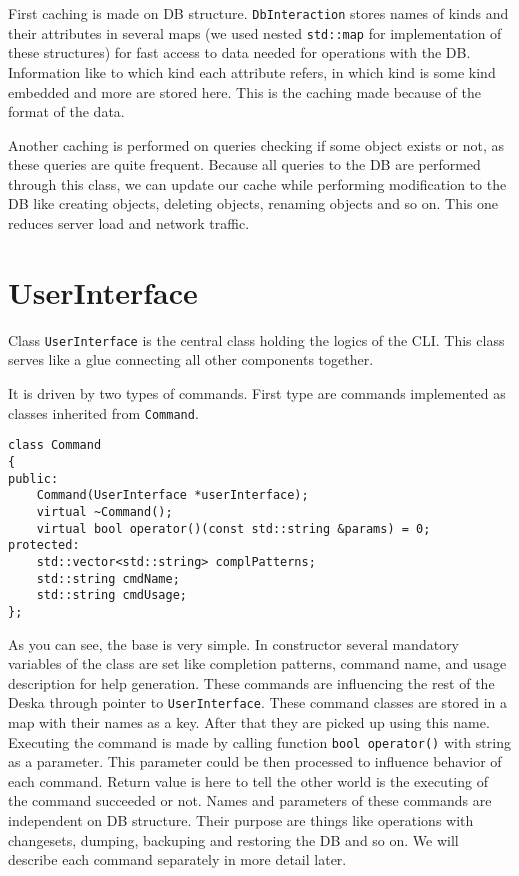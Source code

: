 \documentclass[deska]{subfiles}
\begin{document}
First caching is made on DB structure. {\tt DbInteraction} stores names of kinds and their attributes in several maps
(we used nested {\tt std::map} for implementation of these structures) for fast access to data needed for operations with
the DB. Information like to which kind each attribute refers, in which kind is some kind embedded and more are stored
here. This is the caching made because of the format of the data.

Another caching is performed on queries checking if some object exists or not, as these queries are quite frequent.
Because all queries to the DB are performed through this class, we can update our cache while performing modification to
the DB like creating objects, deleting objects, renaming objects and so on. This one reduces server load and network traffic.

\section{UserInterface}

Class {\tt UserInterface} is the central class holding the logics of the CLI. This class serves like a glue connecting
all other components together.

It is driven by two types of commands. First type are commands implemented as classes inherited from {\tt Command}.

\begin{verbatim}
class Command
{
public:
    Command(UserInterface *userInterface);
    virtual ~Command();
    virtual bool operator()(const std::string &params) = 0;
protected:
    std::vector<std::string> complPatterns;
    std::string cmdName;
    std::string cmdUsage;
};
\end{verbatim}

As you can see, the base is very simple. In constructor several mandatory variables of the class are set like
completion patterns, command name, and usage description for help generation. These commands are influencing the rest of
the Deska through pointer to {\tt UserInterface}. These command classes are stored in a map with their names as a key.
After that they are picked up using this name. Executing the command is made by calling function {\tt bool operator()} with
string as a parameter. This parameter could be then processed to influence behavior of each command. Return value is here
to tell the other world is the executing of the command succeeded or not. Names and parameters of these commands
are independent on DB structure. Their purpose are things like operations with changesets, dumping, backuping and restoring
the DB and so on. We will describe each command separately in more detail later.
\end{document}
